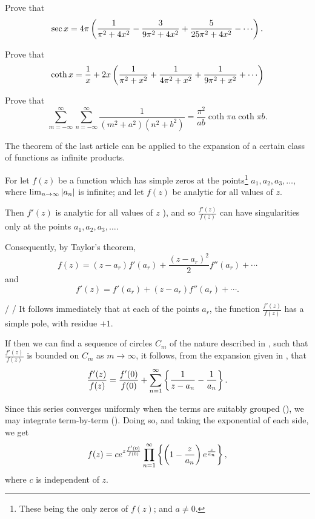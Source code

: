 \begin{wandwexample}
  Prove that
  $$
  \sec x
  =
  4 \pi
  \theparen{
    \frac{1}{\pi^{2} + 4 x^{2}}
    -
    \frac{3}{9\pi^{2} + 4 x^{2}}
    +
    \frac{5}{25 \pi^{2} + 4 x^{2}}
    -
    \cdots
  }.
  $$
\end{wandwexample}
\begin{wandwexample}
  Prove that
  $$
  \coth x
  =
  \frac{1}{x}
  +
  2x
  \theparen{
    \frac{1}{\pi^{2} + x^{2}}
    +
    \frac{1}{4 \pi^{2} + x^{2}}
    +
    \frac{1}{9 \pi^{2} + x^{2}}
    +
    \cdots
  }
  $$
\end{wandwexample}
\begin{wandwexample}
  Prove that
  $$
  \sum_{m=-\infty}^{\infty}
  \sum_{n=-\infty}^{\infty}
  \frac{1}{ (m^{2}+a^{2}) (n^{2}+b^{2}) }
  =
  \frac{\pi^{2}}{ab} \coth \pi a \coth \pi b.
  $$
\end{wandwexample}

The theorem of the last article can be applied to the expansion of a
certain class of functions as infinite products.

For let $f(z)$ be a function which has simple zeros at the
points\footnote{These being the only zeros of $f(z)$; and $a \neq 0$.}
$a_{1}, a_{2}, a_{3}, \ldots$, where
$\lim_{n \rightarrow \infty} \left| a_{n} \right|$ is infinite; and let
$f(z)$ be analytic for all values of $z$.

Then $f'(z)$ is analytic for all values of $z$
), and so $\frac{f'(z)}{f(z)}$ can have
singularities only at the points $a_{1}, a_{2}, a_{3}, \ldots$.

Consequently, by Taylor's theorem,
$$
f(z)
=
(z-a_{r}) f'(a_{r})
+
\frac{ (z-a_{r})^{2} }{2} f''(a_{r})
+
\cdots
$$
and
$$
f'(z)
=
f'(a_{r})
+
(z-a_{r}) f''(a_{r})
+
\cdots.
$$

/ /
%
%
It follows immediately that at each of the points $a_{r}$, the
function
$\frac{f'(z)}{f(z)}$ has a simple pole, with residue $+1$.

If then we can find a sequence of circles $C_{m}$ of the nature described
in , such that $\frac{f'(z)}{f(z)}$ is bounded on
$C_{m}$ as $m \rightarrow \infty$, it follows, from the
expansion given in , that
$$
\frac{f'(z)}{f(z)}
=
\frac{f'(0)}{f(0)}
+
\sum_{n=1}^{\infty}
\left\{ 
  \frac{1}{z-a_{n}}
  -
  \frac{1}{a_{n}}
 \right\}.
$$

Since this series converges uniformly when the terms are suitably
grouped (), we may integrate term-by-term
(). Doing so, and taking the exponential of each
side, we get
$$
f(z)
=
c
e^{ z \frac{f'(0)}{f(0)} }
\prod_{n=1}^{\infty}
\left\{ 
  \left(  1 - \frac{z}{a_{n}}  \right)
  e^{ \frac{z}{a_{n}} }
 \right\},
$$
where $c$ is independent of $z$.

